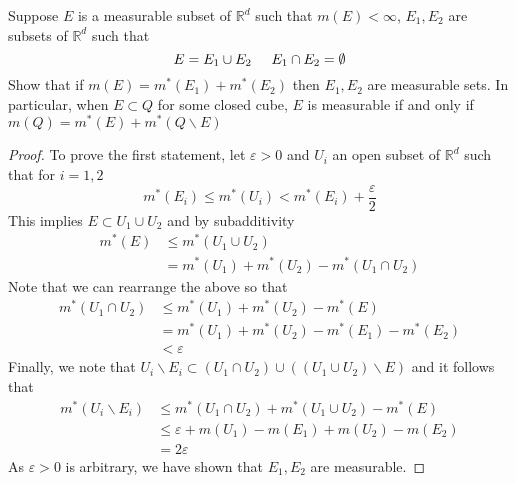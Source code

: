 \documentclass[nocolor]{report}
\begin{document}
   






\newpage
\begin{ex}[Question 4.] Suppose $E$ is a measurable subset of $\mathbb{R}^d$ such that $m(E)<\infty$, $E_1, E_2$ are subsets of $\mathbb{R}^d$ such that 
$$E = E_1 \cup E_2 \hspace{5mm} E_1\cap E_2 = \emptyset$$
Show that if $m(E) = m^*(E_1) + m^*(E_2)$ then $E_1, E_2$ are measurable sets. In particular, when $E\subset Q$ for some closed cube, $E$ is measurable if and only if $m(Q) = m^*(E) + m^*(Q\backslash E)$
\end{ex}
\begin{proof}
To prove the first statement, let $\varepsilon>0$ and $U_i$ an open subset of $\mathbb{R}^d$ such that for $i=1,2$ 
$$m^*(E_i)\leq m^*(U_i) < m^*(E_i) + \frac{\varepsilon}{2}$$
This implies $E \subset U_1 \cup U_2$ and by subadditivity 
\begin{align*}
    m^*(E) &\leq m^*(U_1 \cup U_2) \\
    & = m^*(U_1) + m^*(U_2) - m^*(U_1 \cap U_2)
\end{align*}
Note that we can rearrange the above so that 
\begin{align*}
    m^*(U_1 \cap U_2) &\leq m^*(U_1) + m^*(U_2) - m^*(E) \\ 
    &= m^*(U_1) + m^*(U_2) - m^*(E_1) - m^*(E_2) \\
    &< \varepsilon
\end{align*}
Finally, we note that $U_i \backslash E_i \subset (U_1 \cap U_2) \cup ((U_1 \cup U_2)\backslash E)$ and it follows that 
\begin{align*}
    m^*(U_i \backslash E_i) &\leq m^*(U_1 \cap U_2) + m^*(U_1 \cup U_2) - m^*(E) \\
    &\leq \varepsilon + m(U_1) - m(E_1) + m(U_2) - m(E_2) \\
    &= 2\varepsilon
\end{align*}
As $\varepsilon>0$ is arbitrary, we have shown that $E_1, E_2$ are measurable.
\end{proof}
\end{document}
